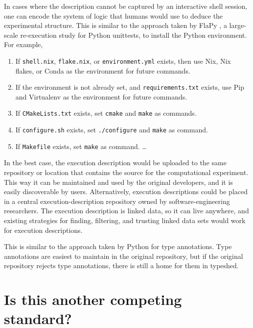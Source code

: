 \documentclass[natbib=false,manuscript,authordraft]{acmart}
\providecommand{\tightlist}{\setlength{\itemsep}{0pt}\setlength{\parskip}{0pt}}
\begin{document}
In cases where the description cannot be captured by an interactive
shell session, one can encode the system of logic that humans would use
to deduce the experimental structure. This is similar to the approach
taken by FlaPy \cite{gruber_empirical_2021}, a large-scale re-execution
study for Python unittests, to install the Python environment. For
example,

\begin{enumerate}
\def\labelenumi{\arabic{enumi}.}
\tightlist
\item
  If \texttt{shell.nix}, \texttt{flake.nix}, or \texttt{environment.yml}
  exists, then use Nix, Nix flakes, or Conda as the environment for
  future commands.
\item
  If the environment is not already set, and \texttt{requirements.txt}
  exists, use Pip and Virtualenv as the environment for future commands.
\item
  If \texttt{CMakeLists.txt} exists, set \texttt{cmake} and
  \texttt{make} as commands.
\item
  If \texttt{configure.sh} exists, set \texttt{./configure} and
  \texttt{make} as command.
\item
  If \texttt{Makefile} exists, set \texttt{make} as command. \ldots{}
\end{enumerate}

In the best case, the execution description would be uploaded to the
same repository or location that contains the source for the
computational experiment. This way it can be maintained and used by the
original developers, and it is easily discoverable by users.
Alternatively, execution descriptions could be placed in a central
execution-description repository owned by software-engineering
researchers. The execution description is linked data, so it can live
anywhere, and existing strategies for finding, filtering, and trusting
linked data sets would work for execution descriptions.

This is similar to the approach taken by Python for type annotations.
Type annotations are easiest to maintain in the original repository, but
if the original repository rejects type annotations, there is still a
home for them in typeshed.

\hypertarget{is-this-another-competing-standard}{%
\section{Is this another competing
standard?}\label{is-this-another-competing-standard}}
\end{document}
